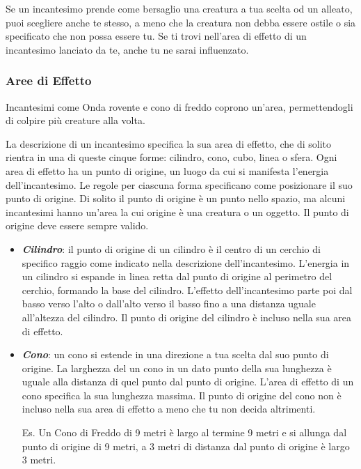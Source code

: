 \begin{multicols}{2}
Se un incantesimo prende come bersaglio una creatura a tua scelta od un alleato, puoi scegliere anche te stesso, a meno che la creatura non debba essere ostile o sia specificato che non possa essere tu. Se ti trovi nell'area di effetto di un incantesimo lanciato da te, anche tu ne sarai influenzato.

\subsubsection{Aree di Effetto}\label{magieareedieffetto}

Incantesimi come Onda rovente e cono di freddo coprono un'area, permettendogli di colpire più creature alla volta.

La descrizione di un incantesimo specifica la sua area di effetto, che di solito rientra in una di queste cinque forme: cilindro, cono, cubo, linea o sfera. Ogni area di effetto ha un punto di origine, un luogo da cui si manifesta l'energia dell'incantesimo. Le regole per ciascuna forma specificano come posizionare il suo punto di origine. Di solito il punto di origine è un punto nello spazio, ma alcuni incantesimi hanno un'area la cui origine è una creatura o un oggetto. Il punto di origine deve essere sempre valido.

\begin{itemize}[leftmargin=*] \setlength{\itemsep}{0pt}
\item \emph{\textbf{Cilindro}}: il punto di origine di un cilindro è il centro di un cerchio di specifico raggio come indicato nella descrizione dell'incantesimo. L'energia in un cilindro si espande in linea retta dal punto di origine al perimetro del cerchio, formando la base del cilindro. L'effetto dell'incantesimo parte poi dal basso verso l'alto o dall'alto verso il basso fino a una distanza uguale all'altezza del cilindro. Il punto di origine del cilindro è incluso nella sua area di effetto.

\item \emph{\textbf{Cono}}: un cono si estende in una direzione a tua scelta dal suo punto di origine. La larghezza del un cono in un dato punto della sua lunghezza è uguale alla distanza di quel punto dal punto di origine. L'area di effetto di un cono specifica la sua lunghezza massima. Il punto di origine del cono non è incluso nella sua area di effetto a meno che tu non decida altrimenti.

Es. Un Cono di Freddo di 9 metri è largo al termine 9 metri e si allunga dal punto di origine di 9 metri, a 3 metri di distanza dal punto di origine è largo 3 metri.


\end{itemize}
\end{multicols}
